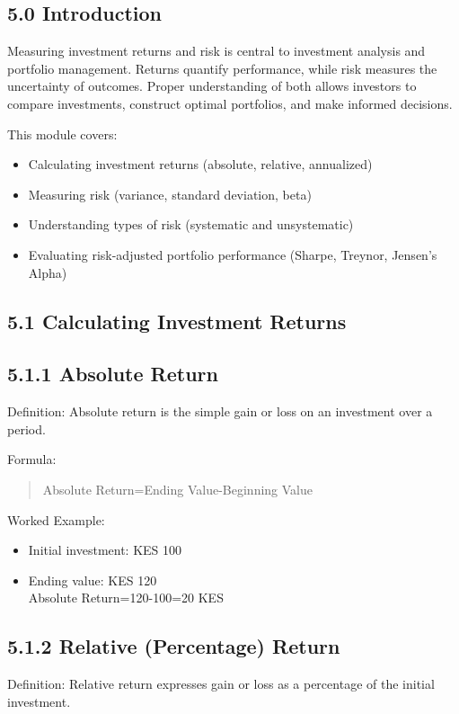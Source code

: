 \documentclass[10pt]{article}
\begin{document}
\subsection*{5.0 Introduction}
Measuring investment returns and risk is central to investment analysis and portfolio management. Returns quantify performance, while risk measures the uncertainty of outcomes. Proper understanding of both allows investors to compare investments, construct optimal portfolios, and make informed decisions.

This module covers:

\begin{itemize}
  \item Calculating investment returns (absolute, relative, annualized)
  \item Measuring risk (variance, standard deviation, beta)
  \item Understanding types of risk (systematic and unsystematic)
  \item Evaluating risk-adjusted portfolio performance (Sharpe, Treynor, Jensen's Alpha)
\end{itemize}

\subsection*{5.1 Calculating Investment Returns}
\subsection*{5.1.1 Absolute Return}
Definition: Absolute return is the simple gain or loss on an investment over a period.

Formula:

\begin{quote}
Absolute Return=Ending Value-Beginning Value
\end{quote}

Worked Example:

\begin{itemize}
  \item Initial investment: KES 100
  \item Ending value: KES 120\\
Absolute Return=120-100=20 KES
\end{itemize}

\subsection*{5.1.2 Relative (Percentage) Return}
Definition: Relative return expresses gain or loss as a percentage of the initial investment.
\end{document}
